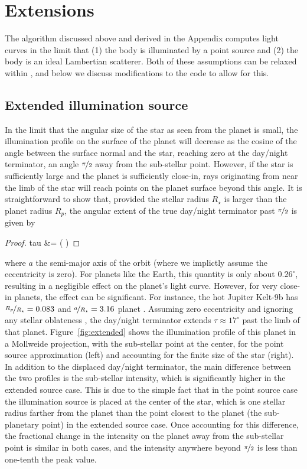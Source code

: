 \documentclass[modern]{aastex62}
\begin{document}
\section{Extensions}
\label{sec:extensions}

The algorithm discussed above and derived in the Appendix computes light
curves in the limit that (1) the body is illuminated by a point source
and (2) the body is an ideal Lambertian scatterer. Both of these
assumptions can be relaxed within \starry, and below we discuss modifications
to the code to allow for this.

\subsection{Extended illumination source}
\label{sec:extended}

In the limit that the angular size of the star as seen from the planet is
small, the illumination profile on the surface of the planet will
decrease as the cosine of the angle between the surface normal and the star,
reaching zero at the day/night terminator, an angle $\nicefrac{\pi}{2}$
away from the sub-stellar point. However, if the star is sufficiently large
and the planet is sufficiently close-in, rays originating from near the limb
of the star will reach points on the planet surface beyond this angle.
It is straightforward to show that, provided the stellar radius $R_\star$
is larger than the planet radius $R_p$, the angular extent of the true
day/night terminator past $\nicefrac{\pi}{2}$ is given by
%
\begin{proof}{tau}
    \label{eq:tau}
    \tau &= \arcsin\left(  \right)
\end{proof}
%
where $a$ the semi-major axis of the orbit (where we implictly assume
the eccentricity is zero).
For planets like the Earth, this quantity is only about $0.26^\circ$,
resulting in a negligible effect on the planet's light curve. However,
for very close-in planets, the effect can be significant. For instance,
the hot Jupiter Kelt-9b has $\nicefrac{R_p}{R_\star} = 0.083$ and
$\nicefrac{a}{R_\star} = 3.16$
planet \citep{Wong2019}. Assuming zero eccentricity and ignoring any
stellar oblateness
\citep[see][]{Ahlers2020},
the day/night terminator extends $\tau \approx 17^\circ$ past the limb
of that planet. Figure~\ref{fig:extended} shows the illumination profile
of this planet in a Mollweide projection, with the sub-stellar point at
the center, for the point source approximation (left) and accounting for
the finite size of the star (right). In addition to the
displaced day/night terminator, the main difference between
the two profiles is the sub-stellar intensity, which is significantly higher
in the extended source case. This is due to the simple fact that in the point
source case the illumination source is placed at the center of the star,
which is one stellar radius farther from the planet than the point closest
to the planet (the sub-planetary point) in the extended source case.
Once accounting for this difference, the fractional change in the intensity
on the planet away from the sub-stellar point is similar in both cases,
and the intensity anywhere beyond $\nicefrac{\pi}{2}$ is less than one-tenth
the peak value.
\end{document}
